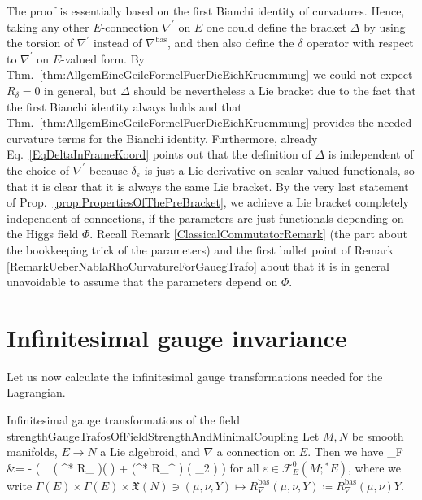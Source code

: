 \begin{remark}\label{RemarkBracketIsVeryIndependent}
\leavevmode\newline
The proof is essentially based on the first Bianchi identity of curvatures. Hence, taking any other $E$-connection $\nabla^\prime$ on $E$ one could define the bracket $\Delta$ by using the torsion of $\nabla^\prime$ instead of $\nabla^{\mathrm{bas}}$, and then also define the $\delta$ operator with respect to $\nabla^\prime$ on $E$-valued form. By Thm.~\ref{thm:AllgemEineGeileFormelFuerDieEichKruemmung} we could not expect $R_\delta=0$ in general, but $\Delta$ should be nevertheless a Lie bracket due to the fact that the first Bianchi identity always holds and that Thm.~\ref{thm:AllgemEineGeileFormelFuerDieEichKruemmung} provides the needed curvature terms for the Bianchi identity. Furthermore, already Eq.~\eqref{EqDeltaInFrameKoord} points out that the definition of $\Delta$ is independent of the choice of $\nabla^\prime$ because $\delta_\varepsilon$ is just a Lie derivative on scalar-valued functionals, so that it is clear that it is always the same Lie bracket. By the very last statement of Prop.~\ref{prop:PropertiesOfThePreBracket}, we achieve a Lie bracket completely independent of connections, if the parameters are just functionals depending on the Higgs field $\Phi$. Recall Remark \ref{ClassicalCommutatorRemark} (the part about the bookkeeping trick of the parameters) and the first bullet point of Remark \ref{RemarkUeberNablaRhoCurvatureForGauegTrafo} about that it is in general unavoidable to assume that the parameters depend on $\Phi$.
\end{remark}

\section{Infinitesimal gauge invariance}\label{InfInvariance}

Let us now calculate the infinitesimal gauge transformations needed for the Lagrangian.

\begin{propositions}{Infinitesimal gauge transformations of the field strength}{GaugeTrafosOfFieldStrengthAndMinimalCoupling}
Let $M, N$ be smooth manifolds, $E \to N$ a Lie algebroid, and $\nabla$ a connection on $E$. Then we have
\ba
\delta_\varepsilon F
&=
- \mleft(
	 ~ \mleft(	{}^* R_{\nabla} \mright)\mleft(  \stackrel{\wedge}{,}  \mright) \varepsilon
	+ \mleft({}^* R_\nabla^{} \mright) \mleft(\varepsilon \stackrel{\wedge}{,} \varpi_2  \stackrel{\wedge}{,}  \mright)
\mright) \label{EqVariationForF}
\ea
for all $\varepsilon \in \mathcal{F}^0_E(M; {}^*E)$, where we write $\Gamma(E) \times \Gamma(E) \times \mathfrak{X}(N) \ni (\mu, \nu, Y) \mapsto R_\nabla^{\mathrm{bas}}(\mu, \nu, Y) \coloneqq R_\nabla^{\mathrm{bas}}(\mu, \nu) Y$.
\end{propositions}

